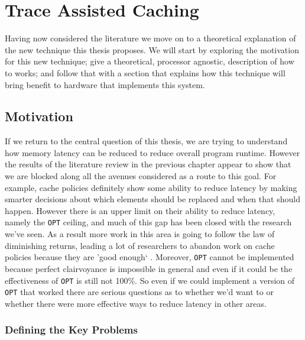 \chapter{Trace Assisted Caching}
\label{chap:trace-assisted-caching}

Having now considered the literature we move on to a theoretical explanation of the new technique this thesis proposes. We will start by exploring the motivation for this new technique; give a theoretical, processor agnostic, description of how to works; and follow that with a section that explains how this technique will bring benefit to hardware that implements this system.

\section{Motivation}

If we return to the central question of this thesis, we are trying to understand how memory latency can be reduced to reduce overall program runtime. However the results of the literature review in the previous chapter appear to show that we are blocked along all the avenues considered as a route to this goal. For example, cache policies definitely show some ability to reduce latency by making smarter decisions about which elements should be replaced and when that should happen. However there is an upper limit on their ability to reduce latency, namely the \texttt{OPT} ceiling, and much of this gap has been closed with the research we've seen. As a result more work in this area is going to follow the law of diminishing returns, leading a lot of researchers to abandon work on cache policies because they are 'good enough` \cite{podlipnigSurveyWebCache2003}. Moreover, \texttt{OPT} cannot be implemented because perfect clairvoyance is impossible in general and even if it could be the effectiveness of \texttt{OPT} is still not 100\%. So even if we could implement a version of \texttt{OPT} that worked there are serious questions as to whether we'd want to or whether there were more effective ways to reduce latency in other areas.

\subsection{Defining the Key Problems}

